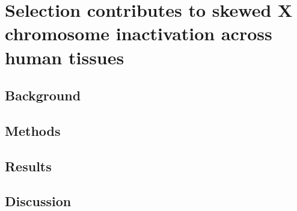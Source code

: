 \chapter{Selection contributes to skewed X chromosome inactivation across human tissues}
\section{Background}
\section{Methods}
\section{Results}
\section{Discussion}